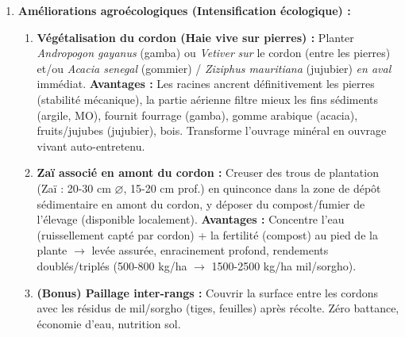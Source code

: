 \documentclass[11pt]{article}
\begin{document}
\begin{corrige}
\begin{enumerate}
\begin{itemize}
        \item \textbf{Adapté au régime pluviométrique :} Pluies intenses, courtes, orageuses (fortes intensités horaires $\rightarrow$ ruissellement violent). Les cordons captent ce ruissellement « gratuit » pour l'infiltrer (supplément hydrique crucial pour le cycle cultural court du mil/sorgho).
        \item \textbf{Résistance au feu :} Pas de partie végétale aérienne sèche inflammable en saison sèche (contrairement aux haies vives/herbes), résistant aux feux de brousse fréquents.
        \item \textbf{Tenure foncière :} Adapté aux terres collectives/gérées par le chef de terre, ne nécessite pas de titre foncier individuel.
    \end{itemize}
    \item \textbf{Améliorations agroécologiques (Intensification écologique) :}
    \begin{enumerate}
        \item \textbf{Végétalisation du cordon (Haie vive sur pierres) :} Planter \emph{Andropogon gayanus} (gamba) ou \emph{Vetiver} \emph{sur} le cordon (entre les pierres) et/ou \emph{Acacia senegal} (gommier) / \emph{Ziziphus mauritiana} (jujubier) \emph{en aval} immédiat. \textbf{Avantages :} Les racines ancrent définitivement les pierres (stabilité mécanique), la partie aérienne filtre mieux les fins sédiments (argile, MO), fournit fourrage (gamba), gomme arabique (acacia), fruits/jujubes (jujubier), bois. Transforme l'ouvrage minéral en ouvrage vivant auto-entretenu.
        \item \textbf{Zaï associé en amont du cordon :} Creuser des trous de plantation (Zaï : 20-30 cm $\varnothing$, 15-20 cm prof.) en quinconce dans la zone de dépôt sédimentaire en amont du cordon, y déposer du compost/fumier de l'élevage (disponible localement). \textbf{Avantages :} Concentre l'eau (ruissellement capté par cordon) + la fertilité (compost) au pied de la plante $\rightarrow$ levée assurée, enracinement profond, rendements doublés/triplés (500-800 kg/ha $\rightarrow$ 1500-2500 kg/ha mil/sorgho).
        \item \textbf{(Bonus) Paillage inter-rangs :} Couvrir la surface entre les cordons avec les résidus de mil/sorgho (tiges, feuilles) après récolte. Zéro battance, économie d'eau, nutrition sol.
    \end{enumerate}
\end{enumerate}
\end{corrige}
\end{document}
